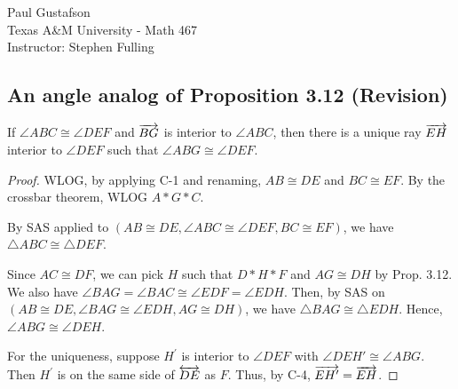\documentclass{article}
\begin{document}
\noindent Paul Gustafson\\
\noindent Texas A\&M University - Math 467\\ 
\noindent Instructor: Stephen Fulling

\subsection*{An angle analog of Proposition 3.12 (Revision)}

 If $\angle ABC \cong \angle DEF$ and $\overrightarrow{BG}$ is interior to $\angle ABC$, then there is a unique ray $\overrightarrow{EH}$ interior to $\angle DEF$ such that $\angle ABG \cong \angle DEF$.

\begin{proof}
WLOG, by applying C-1 and renaming, $AB \cong DE$ and $BC \cong EF$. By the crossbar theorem, WLOG $A * G * C$. 

By SAS applied to $(AB \cong DE, \angle ABC \cong \angle DEF, BC \cong EF)$, we have $\triangle ABC \cong \triangle DEF$.

Since $AC \cong DF$, we can pick $H$ such that $D * H * F$ and $AG \cong DH$ by Prop. 3.12. We also have $\angle BAG = \angle BAC \cong \angle EDF = \angle EDH$.  Then, by SAS on $(AB \cong DE, \angle BAG \cong \angle EDH, AG \cong DH)$, we have $\triangle BAG \cong \triangle EDH$. Hence, $\angle ABG \cong \angle DEH$.

For the uniqueness, suppose $H^\prime$ is interior to $\angle DEF$ with $\angle DEH' \cong \angle ABG$. Then $H^\prime$ is on the same side of $\overleftrightarrow{DE}$ as $F$. Thus, by C-4, $\overrightarrow{EH'} = \overrightarrow{EH}$.
\end{proof}
\end{document}
